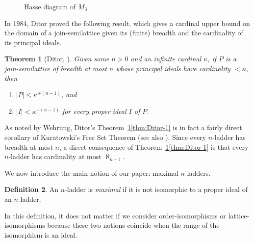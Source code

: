 \documentclass[]{amsart}
\newtheorem{theorem}{Theorem}[section]
\theoremstyle{definition}
\newtheorem{definition}[theorem]{Definition}
\theoremstyle{remark}
\begin{document}
\begin{figure}[H]
\centering
{}
\caption{Hasse diagram of $M_3$}
\end{figure}
In 1984, Ditor proved the following result, which gives a cardinal upper bound on the domain of a join-semilattice given its (finite) breadth and the cardinality of its principal ideals. 
\begin{theorem}[{Ditor, \cite{MR0732199}}]\label{thm:Ditor}
Given some $n > 0$ and an infinite cardinal $\kappa$, if $P$ is a join-semilattice of breadth at most $n$ whose principal ideals have cardinality $< \kappa$, then
\begin{enumerate}[label={\upshape (\arabic*)}]
\itemsep0.3em
\item\label{thm:Ditor-1}
\( |P| \le \kappa^{+(n-1)} \), and
\item \label{thm:Ditor-2}
\( |I| < \kappa^{+(n-1)} \) for every proper ideal $I$ of $P$.
\end{enumerate}
\end{theorem}

As noted by Wehrung, Ditor's Theorem~\ref{thm:Ditor}\ref{thm:Ditor-1} is in fact a fairly direct corollary of Kuratowski's Free Set Theorem \cite{MR48518} (see also \cite[Theorem 46.1]{MR795592}). Since every $n$-ladder has breadth at most $n$, a direct consequence of Theorem~\ref{thm:Ditor}\ref{thm:Ditor-1} is that every  $n$-ladder has cardinality at most $\aleph_{n-1}$. 


We now introduce the main notion of our paper: maximal $n$-ladders. 

\begin{definition}\label{def:maximal}
An $n$-ladder is \emph{maximal} if it is not isomorphic to a proper ideal of an $n$-ladder.
\end{definition}

In this definition, it does not matter if we consider order-isomorphisms or lattice-isomorphisms because these two notions coincide when the range of the isomorphism is an ideal.
\end{document}
